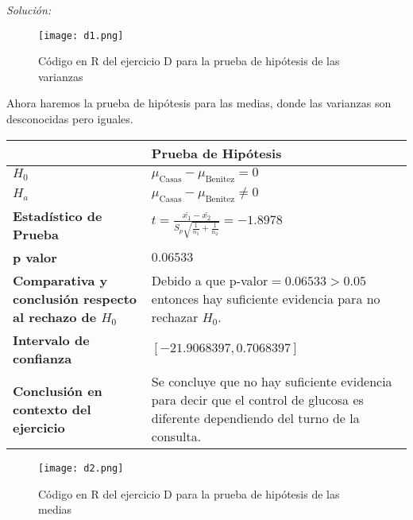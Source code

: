 \documentclass[12pt]{article}
\newenvironment{sol}
    {\emph{Solución:}
    }
    {
    }
\begin{document}
\begin{sol}
\pagebreak
\begin{figure}[h]  %
    \centering      %
    \texttt{[image: d1.png]} 
    \caption{Código en R del ejercicio D para la prueba de hipótesis de las varianzas}
\end{figure}
Ahora haremos la prueba de hipótesis para las medias, donde las varianzas son desconocidas pero iguales.

\begin{table}[h!]
\centering
\begin{tabular}{|>{\raggedright\arraybackslash}m{6cm}|>{\raggedright\arraybackslash}m{6cm}|}
\hline
 & \textbf{Prueba de Hipótesis} \\ \hline
$H_0$ & $\mu_{\text{Casas}}-\mu_{\text{Benitez}}=0$ \\ \hline
$H_a$ & $\mu_{\text{Casas}}-\mu_{\text{Benitez}}\neq0$ \\ \hline
\textbf{Estadístico de Prueba} & \vspace{0.5cm}$t=\frac{\bar{x_1}-\bar{x_2}}{S_p\sqrt{\frac{1}{n_1}+\frac{1}{n_2}}}=-1.8978$\vspace{0.5cm} \\ \hline
\textbf{p valor} & $0.06533$ \\ \hline
\textbf{Comparativa y conclusión respecto al rechazo de $H_0$} & Debido a que p-valor$=0.06533>0.05$ entonces hay suficiente evidencia para no rechazar $H_0$. \\ \hline
\textbf{Intervalo de confianza} & $[-21.9068397,0.7068397]$ \\ \hline
\textbf{Conclusión en contexto del ejercicio} & Se concluye que no hay suficiente evidencia para decir que el control de glucosa es diferente dependiendo del turno de la consulta. \\ \hline
\end{tabular}
\label{tab:hipotesis}
\end{table}
\pagebreak
\begin{figure}[h]  %
    \centering      %
    \texttt{[image: d2.png]} 
    \caption{Código en R del ejercicio D para la prueba de hipótesis de las medias}
\end{figure}
\end{sol}

\pagebreak

\end{document}

